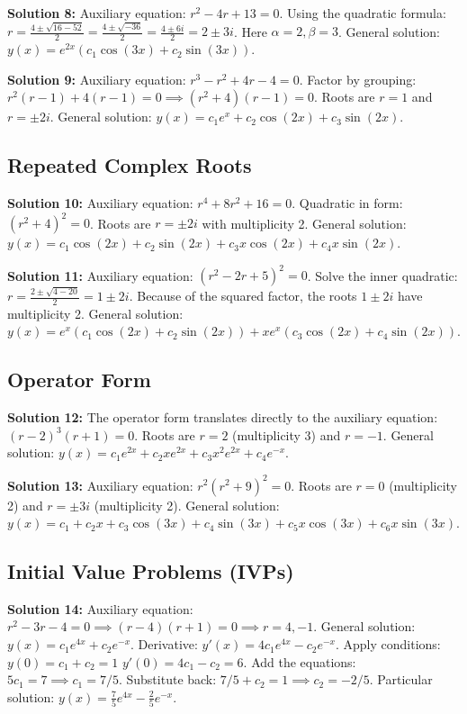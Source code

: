 \documentclass[12pt]{article}
\begin{document}
\textbf{Solution 8:} 
Auxiliary equation: $r^2 - 4r + 13 = 0$. 
Using the quadratic formula: $r = \frac{4 \pm \sqrt{16 - 52}}{2} = \frac{4 \pm \sqrt{-36}}{2} = \frac{4 \pm 6i}{2} = 2 \pm 3i$. 
Here $\alpha = 2, \beta = 3$. 
General solution: $y(x) = e^{2x}(c_1\cos(3x) + c_2\sin(3x))$.

\textbf{Solution 9:} 
Auxiliary equation: $r^3 - r^2 + 4r - 4 = 0$. 
Factor by grouping: $r^2(r-1) + 4(r-1) = 0 \implies (r^2+4)(r-1) = 0$. 
Roots are $r = 1$ and $r = \pm 2i$. 
General solution: $y(x) = c_1e^x + c_2\cos(2x) + c_3\sin(2x)$.

\subsection*{Repeated Complex Roots}
\textbf{Solution 10:} 
Auxiliary equation: $r^4 + 8r^2 + 16 = 0$. 
Quadratic in form: $(r^2+4)^2 = 0$. 
Roots are $r = \pm 2i$ with multiplicity 2. 
General solution: $y(x) = c_1\cos(2x) + c_2\sin(2x) + c_3x\cos(2x) + c_4x\sin(2x)$.

\textbf{Solution 11:} 
Auxiliary equation: $(r^2 - 2r + 5)^2 = 0$. 
Solve the inner quadratic: $r = \frac{2 \pm \sqrt{4-20}}{2} = 1 \pm 2i$. 
Because of the squared factor, the roots $1 \pm 2i$ have multiplicity 2. 
General solution: $y(x) = e^x(c_1\cos(2x) + c_2\sin(2x)) + xe^x(c_3\cos(2x) + c_4\sin(2x))$.

\subsection*{Operator Form}
\textbf{Solution 12:} 
The operator form translates directly to the auxiliary equation: $(r-2)^3(r+1) = 0$. 
Roots are $r = 2$ (multiplicity 3) and $r = -1$. 
General solution: $y(x) = c_1e^{2x} + c_2xe^{2x} + c_3x^2e^{2x} + c_4e^{-x}$.

\textbf{Solution 13:} 
Auxiliary equation: $r^2(r^2+9)^2 = 0$. 
Roots are $r = 0$ (multiplicity 2) and $r = \pm 3i$ (multiplicity 2). 
General solution: $y(x) = c_1 + c_2x + c_3\cos(3x) + c_4\sin(3x) + c_5x\cos(3x) + c_6x\sin(3x)$.

\subsection*{Initial Value Problems (IVPs)}
\textbf{Solution 14:} 
Auxiliary equation: $r^2 - 3r - 4 = 0 \implies (r-4)(r+1) = 0 \implies r = 4, -1$. 
General solution: $y(x) = c_1e^{4x} + c_2e^{-x}$. 
Derivative: $y'(x) = 4c_1e^{4x} - c_2e^{-x}$. 
Apply conditions: 
$y(0) = c_1 + c_2 = 1$ 
$y'(0) = 4c_1 - c_2 = 6$. 
Add the equations: $5c_1 = 7 \implies c_1 = 7/5$. 
Substitute back: $7/5 + c_2 = 1 \implies c_2 = -2/5$. 
Particular solution: $y(x) = \frac{7}{5}e^{4x} - \frac{2}{5}e^{-x}$.
\end{document}
